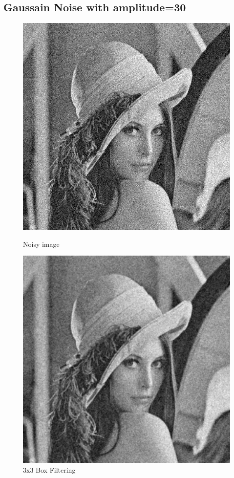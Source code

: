 \documentclass{article}
\begin{document}
\subsection{Gaussain Noise with amplitude=30}
\begin{figure}[H]
  \includegraphics[width=\linewidth]{img/g30.png}
  \caption{Noisy image}\label{fig:g30}
\endminipage\hfill
{}
  \includegraphics[width=\linewidth]{img/g30_box_3x3.png}
  \caption{3x3 Box Filtering}\label{fig:g30_box_3x3}
\endminipage\hfill
\end{figure}
\end{document}
